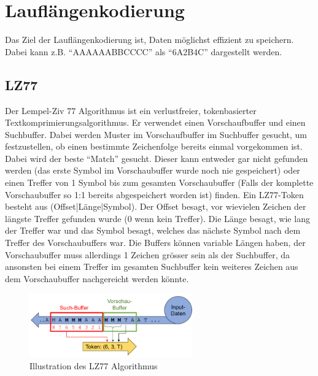 \documentclass{article}
\begin{document}
\section{Lauflängenkodierung}
Das Ziel der Lauflängenkodierung ist, Daten möglichst effizient zu speichern. Dabei kann z.B. ``AAAAAABBCCCC'' als ``6A2B4C'' dargestellt werden.
\subsection{LZ77}
Der Lempel-Ziv 77 Algorithmus ist ein verlustfreier, tokenbasierter Textkomprimierungsalgorithmus. Er verwendet einen Vorschaufbuffer und einen Suchbuffer. Dabei werden Muster im Vorschaufbuffer im Suchbuffer gesucht, um festzustellen, ob einen bestimmte Zeichenfolge bereits einmal vorgekommen ist. Dabei wird der beste ``Match'' gesucht. Dieser kann entweder gar nicht gefunden werden (das erste Symbol im Vorschaubuffer wurde noch nie gespeichert) oder einen Treffer von 1 Symbol bis zum gesamten Vorschaubuffer (Falls der komplette Vorschaubuffer so 1:1 bereits abgespeichert worden ist) finden. Ein LZ77-Token besteht aus (Offset|Länge|Symbol). Der Offset besagt, vor wievielen Zeichen der längste Treffer gefunden wurde (0 wenn kein Treffer). Die Länge besagt, wie lang der Treffer war und das Symbol besagt, welches das nächste Symbol nach dem Treffer des Vorschaubuffers war. Die Buffers können variable Längen haben, der Vorschaubuffer muss allerdings 1 Zeichen grösser sein als der Suchbuffer, da ansonsten bei einem Treffer im gesamten Suchbuffer kein weiteres Zeichen aus dem Vorschaubuffer nachgereicht werden könnte.
\begin{figure}[h]
		\begin{center}
		\includegraphics[width=7cm]{img/lz.png}
		\end{center}
		\caption{Illustration des LZ77 Algorithmus}
		\label{fig:Illustration des LZ77 Algorithmus}
\end{figure}
\end{document}
